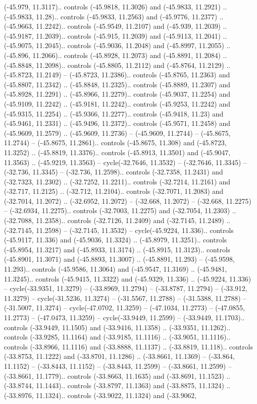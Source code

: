 \begin{scope}[shift={(2.5552, 9.9912)}]
\begin{scope}[shift={(48.1654, -14.8546)}]
(-45.979, 11.3117).. controls (-45.9818, 11.3026) and (-45.9833, 11.2921) .. (-45.9833, 11.28).. controls (-45.9833, 11.2563) and (-45.9776, 11.2377) .. (-45.9663, 11.2242).. controls (-45.9549, 11.2107) and (-45.939, 11.2039) .. (-45.9187, 11.2039).. controls (-45.915, 11.2039) and (-45.9113, 11.2041) .. (-45.9075, 11.2045).. controls (-45.9036, 11.2048) and (-45.8997, 11.2055) .. (-45.896, 11.2066).. controls (-45.8928, 11.2073) and (-45.8891, 11.2084) .. (-45.8848, 11.2098).. controls (-45.8805, 11.2112) and (-45.8764, 11.2129) .. (-45.8723, 11.2149) -- (-45.8723, 11.2386).. controls (-45.8765, 11.2363) and (-45.8807, 11.2342) .. (-45.8848, 11.2325).. controls (-45.8889, 11.2307) and (-45.8928, 11.2291) .. (-45.8966, 11.2279).. controls (-45.9037, 11.2254) and (-45.9109, 11.2242) .. (-45.9181, 11.2242).. controls (-45.9253, 11.2242) and (-45.9315, 11.2254) .. (-45.9366, 11.2277).. controls (-45.9418, 11.23) and (-45.9461, 11.2331) .. (-45.9496, 11.2372).. controls (-45.9571, 11.2458) and (-45.9609, 11.2579) .. (-45.9609, 11.2736) -- (-45.9609, 11.2744) -- (-45.8675, 11.2744) -- (-45.8675, 11.2861).. controls (-45.8675, 11.308) and (-45.8723, 11.3252) .. (-45.8819, 11.3376).. controls (-45.8913, 11.3501) and (-45.9047, 11.3563) .. (-45.9219, 11.3563) -- cycle(-32.7646, 11.3532) -- (-32.7646, 11.3345) -- (-32.736, 11.3345) -- (-32.736, 11.2598).. controls (-32.7358, 11.2431) and (-32.7323, 11.2302) .. (-32.7252, 11.2211).. controls (-32.7214, 11.2161) and (-32.717, 11.2125) .. (-32.712, 11.2104).. controls (-32.7071, 11.2083) and (-32.7014, 11.2072) .. (-32.6952, 11.2072) -- (-32.668, 11.2072) -- (-32.668, 11.2275) -- (-32.6934, 11.2275).. controls (-32.7003, 11.2275) and (-32.7054, 11.2303) .. (-32.7088, 11.2358).. controls (-32.7126, 11.2409) and (-32.7145, 11.2489) .. (-32.7145, 11.2598) -- (-32.7145, 11.3532) -- cycle(-45.9224, 11.336).. controls (-45.9117, 11.336) and (-45.9036, 11.3324) .. (-45.8979, 11.3251).. controls (-45.8954, 11.3217) and (-45.8933, 11.3174) .. (-45.8915, 11.3123).. controls (-45.8901, 11.3071) and (-45.8893, 11.3007) .. (-45.8891, 11.293) -- (-45.9598, 11.293).. controls (-45.9586, 11.3064) and (-45.9547, 11.3169) .. (-45.9481, 11.3245).. controls (-45.9415, 11.3322) and (-45.9329, 11.336) .. (-45.9224, 11.336) -- cycle(-33.9351, 11.3279) -- (-33.8969, 11.2794) -- (-33.8787, 11.2794) -- (-33.912, 11.3279) -- cycle(-31.5236, 11.3274) -- (-31.5567, 11.2788) -- (-31.5388, 11.2788) -- (-31.5007, 11.3274) -- cycle(-47.0702, 11.3259) -- (-47.1034, 11.2773) -- (-47.0855, 11.2773) -- (-47.0473, 11.3259) -- cycle(-33.9449, 11.2599) -- (-33.9449, 11.1703).. controls (-33.9449, 11.1505) and (-33.9416, 11.1358) .. (-33.9351, 11.1262).. controls (-33.9285, 11.1164) and (-33.9185, 11.1116) .. (-33.9051, 11.1116).. controls (-33.8966, 11.1116) and (-33.8888, 11.1137) .. (-33.8819, 11.118).. controls (-33.8753, 11.1222) and (-33.8701, 11.1286) .. (-33.8661, 11.1369) -- (-33.864, 11.1152) -- (-33.8443, 11.1152) -- (-33.8443, 11.2599) -- (-33.8661, 11.2599) -- (-33.8661, 11.1779).. controls (-33.8663, 11.1635) and (-33.8691, 11.1523) .. (-33.8744, 11.1443).. controls (-33.8797, 11.1363) and (-33.8875, 11.1324) .. (-33.8976, 11.1324).. controls (-33.9022, 11.1324) and (-33.9062, 
\end{scope}
\end{scope}
